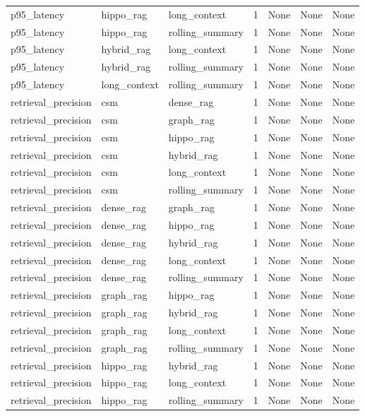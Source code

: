 \begin{tabular}{lllllll}
p95\_latency & hippo\_rag & long\_context & 1 & None & None & None \\
p95\_latency & hippo\_rag & rolling\_summary & 1 & None & None & None \\
p95\_latency & hybrid\_rag & long\_context & 1 & None & None & None \\
p95\_latency & hybrid\_rag & rolling\_summary & 1 & None & None & None \\
p95\_latency & long\_context & rolling\_summary & 1 & None & None & None \\
retrieval\_precision & csm & dense\_rag & 1 & None & None & None \\
retrieval\_precision & csm & graph\_rag & 1 & None & None & None \\
retrieval\_precision & csm & hippo\_rag & 1 & None & None & None \\
retrieval\_precision & csm & hybrid\_rag & 1 & None & None & None \\
retrieval\_precision & csm & long\_context & 1 & None & None & None \\
retrieval\_precision & csm & rolling\_summary & 1 & None & None & None \\
retrieval\_precision & dense\_rag & graph\_rag & 1 & None & None & None \\
retrieval\_precision & dense\_rag & hippo\_rag & 1 & None & None & None \\
retrieval\_precision & dense\_rag & hybrid\_rag & 1 & None & None & None \\
retrieval\_precision & dense\_rag & long\_context & 1 & None & None & None \\
retrieval\_precision & dense\_rag & rolling\_summary & 1 & None & None & None \\
retrieval\_precision & graph\_rag & hippo\_rag & 1 & None & None & None \\
retrieval\_precision & graph\_rag & hybrid\_rag & 1 & None & None & None \\
retrieval\_precision & graph\_rag & long\_context & 1 & None & None & None \\
retrieval\_precision & graph\_rag & rolling\_summary & 1 & None & None & None \\
retrieval\_precision & hippo\_rag & hybrid\_rag & 1 & None & None & None \\
retrieval\_precision & hippo\_rag & long\_context & 1 & None & None & None \\
retrieval\_precision & hippo\_rag & rolling\_summary & 1 & None & None & None \\

\end{tabular}
